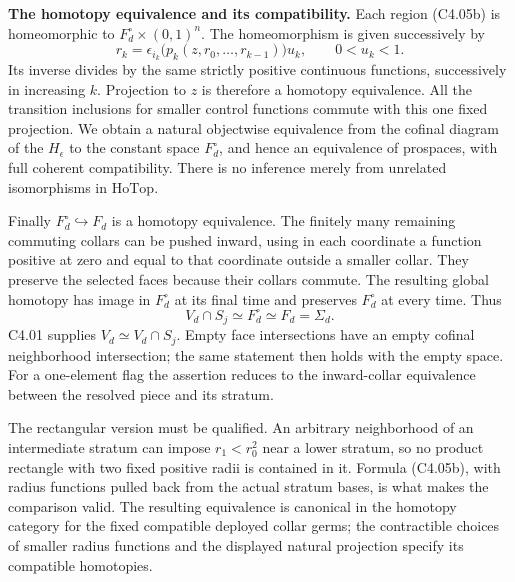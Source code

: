 \textbf{The homotopy equivalence and its compatibility.} Each region (C4.05b) is homeomorphic to \(F_d^\circ\times(0,1)^n\). The homeomorphism is given successively by
\[
 r_k=\epsilon_{i_k}\bigl(p_k(z,r_0,\ldots,r_{k-1})\bigr)u_k,
 \qquad 0<u_k<1.
\]
Its inverse divides by the same strictly positive continuous functions, successively in increasing \(k\). Projection to \(z\) is therefore a homotopy equivalence. All the transition inclusions for smaller control functions commute with this one fixed projection. We obtain a natural objectwise equivalence from the cofinal diagram of the \(H_\epsilon\) to the constant space \(F_d^\circ\), and hence an equivalence of prospaces, with full coherent compatibility. There is no inference merely from unrelated isomorphisms in \(\mathrm{HoTop}\).

Finally \(F_d^\circ\hookrightarrow F_d\) is a homotopy equivalence. The finitely many remaining commuting collars can be pushed inward, using in each coordinate a function positive at zero and equal to that coordinate outside a smaller collar. They preserve the selected faces because their collars commute. The resulting global homotopy has image in \(F_d^\circ\) at its final time and preserves \(F_d^\circ\) at every time. Thus
\[
 V_d\cap S_j\simeq F_d^\circ\simeq F_d=\Sigma_d.
\]
C4.01 supplies \(V_d\simeq V_d\cap S_j\). Empty face intersections have an empty cofinal neighborhood intersection; the same statement then holds with the empty space. For a one-element flag the assertion reduces to the inward-collar equivalence between the resolved piece and its stratum.

The rectangular version must be qualified. An arbitrary neighborhood of an intermediate stratum can impose \(r_1<r_0^2\) near a lower stratum, so no product rectangle with two fixed positive radii is contained in it. Formula (C4.05b), with radius functions pulled back from the actual stratum bases, is what makes the comparison valid. The resulting equivalence is canonical in the homotopy category for the fixed compatible deployed collar germs; the contractible choices of smaller radius functions and the displayed natural projection specify its compatible homotopies.
